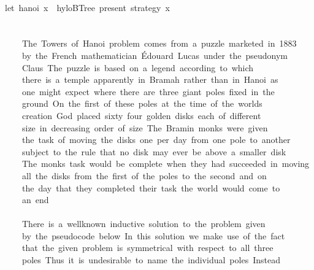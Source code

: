 \documentclass[a4paper]{article}
\begin{document}
\begin{tabbing}
\ttfamily ~\\
\ttfamily ~let~hanoi~x~~hyloBTree~present~strategy~x\\
\ttfamily ~\\
\ttfamily ~\\
\ttfamily ~~~~~The~Towers~of~Hanoi~problem~comes~from~a~puzzle~marketed~in~1883\\
\ttfamily ~~~~~by~the~French~mathematician~Édouard~Lucas~under~the~pseudonym\\
\ttfamily ~~~~~Claus~The~puzzle~is~based~on~a~legend~according~to~which\\
\ttfamily ~~~~~there~is~a~temple~apparently~in~Bramah~rather~than~in~Hanoi~as\\
\ttfamily ~~~~~one~might~expect~where~there~are~three~giant~poles~fixed~in~the\\
\ttfamily ~~~~~ground~On~the~first~of~these~poles~at~the~time~of~the~worlds\\
\ttfamily ~~~~~creation~God~placed~sixty~four~golden~disks~each~of~different\\
\ttfamily ~~~~~size~in~decreasing~order~of~size~The~Bramin~monks~were~given\\
\ttfamily ~~~~~the~task~of~moving~the~disks~one~per~day~from~one~pole~to~another\\
\ttfamily ~~~~~subject~to~the~rule~that~no~disk~may~ever~be~above~a~smaller~disk\\
\ttfamily ~~~~~The~monks~task~would~be~complete~when~they~had~succeeded~in~moving\\
\ttfamily ~~~~~all~the~disks~from~the~first~of~the~poles~to~the~second~and~on\\
\ttfamily ~~~~~the~day~that~they~completed~their~task~the~world~would~come~to\\
\ttfamily ~~~~~an~end\\
\ttfamily ~~~~~\\
\ttfamily ~~~~~There~is~a~wellknown~inductive~solution~to~the~problem~given\\
\ttfamily ~~~~~by~the~pseudocode~below~In~this~solution~we~make~use~of~the~fact\\
\ttfamily ~~~~~that~the~given~problem~is~symmetrical~with~respect~to~all~three\\
\ttfamily ~~~~~poles~Thus~it~is~undesirable~to~name~the~individual~poles~Instead\\

\end{tabbing}
\end{document}

